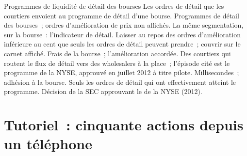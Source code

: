 \begin{strategyfile}{Programmes de liquidité de détail des bourses}\label{strat:hf:retail-wholesaling:rlp}
 Les ordres de détail que les courtiers envoient au programme de détail d'une bourse.
 Programmes de détail des bourses~; ordres d'amélioration de prix non affichés.
 La même segmentation, sur la bourse~: l'indicateur de détail.
 Laisser au repos des ordres d'amélioration inférieure au cent que seuls les ordres de détail peuvent prendre~; couvrir sur le carnet affiché.
 Frais de la bourse~; l'amélioration accordée.
 Des courtiers qui routent le flux de détail vers des wholesalers à la place~; l'épisode cité est le programme de la NYSE, approuvé en juillet 2012 à titre pilote.
 Millisecondes~; adhésion à la bourse.
 Seuls les ordres de détail qui ont effectivement atteint le programme.
 Décision de la SEC approuvant le  de la NYSE (2012).
\end{strategyfile}

\section{Tutoriel~: cinquante actions depuis un téléphone}\label{tut:hf:retail-wholesaling:tut}

